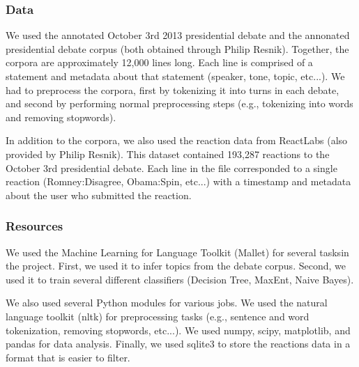 
\subsubsection{Data}

We used the annotated October 3rd 2013 presidential debate and the annonated presidential debate corpus (both obtained through Philip Resnik).
Together, the corpora are approximately 12,000 lines long.
Each line is comprised of a statement and metadata about that statement (speaker, tone, topic, etc...).
We had to preprocess the corpora, first by tokenizing it into turns in each debate, and second by performing normal preprocessing steps (e.g., tokenizing into words and removing stopwords).

In addition to the corpora, we also used the reaction data from ReactLabs (also provided by Philip Resnik).
This dataset contained 193,287 reactions to the October 3rd presidential debate.
Each line in the file corresponded to a single reaction (Romney:Disagree, Obama:Spin, etc...) with a timestamp and metadata about the user who submitted the reaction.

\subsubsection{Resources}

We used the Machine Learning for Language Toolkit (Mallet) for several tasksin the project.
First, we used it to infer topics from the debate corpus.
Second, we used it to train several different classifiers (Decision Tree, MaxEnt, Naive Bayes).

We also used several Python modules for various jobs.
We used the natural language toolkit (nltk) for preprocessing tasks (e.g., sentence and word tokenization, removing stopwords, etc...).
We used numpy, scipy, matplotlib, and pandas for data analysis.
Finally, we used sqlite3 to store the reactions data in a format that is easier to filter.
